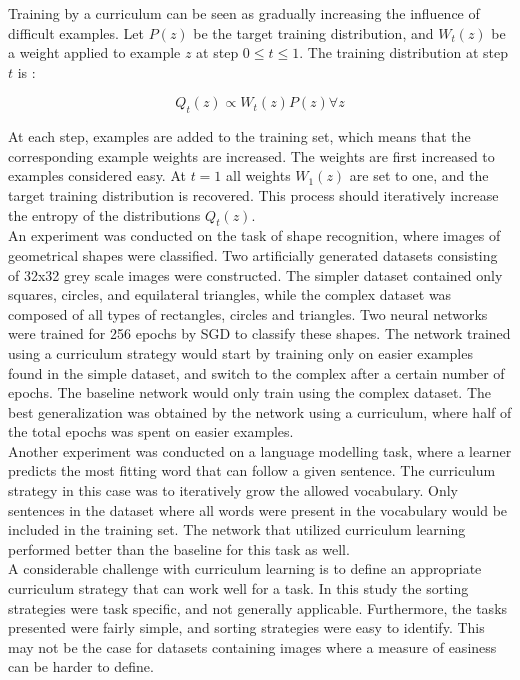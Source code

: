 Training by a curriculum can be seen as gradually increasing the influence of difficult examples. Let $P(z)$ be the target training distribution, and $W_{t}(z)$ be a weight applied to example $z$ at step $0\leq t\leq 1$. The training distribution at step $t$ is :

$$Q_{t}(z)\propto W_{t}(z)P(z)\forall z$$

At each step, examples are added to the training set, which means that the corresponding example weights are increased. The weights are first increased to examples considered easy.  
At $t=1$ all weights $W_{1}(z)$ are set to one, and the target training distribution is recovered. This process should iteratively increase the entropy of the distributions $Q_{t}(z)$. \\


An experiment was conducted on the task of shape recognition, where images of geometrical shapes were classified. Two artificially generated datasets consisting of 32x32 grey scale images were constructed. The simpler dataset contained only squares, circles, and equilateral triangles, while the complex dataset was composed of all types of rectangles, circles and triangles. Two neural networks were trained for 256 epochs by \ac{SGD} to classify these shapes. The network trained using a curriculum strategy would start by training only on easier examples found in the simple dataset, and switch to the complex after a certain number of epochs. The baseline network would only train using the complex dataset. The best generalization was obtained by the network using a curriculum, where half of the total epochs was spent on easier examples. \\

Another experiment was conducted on a language modelling task, where a learner predicts the most fitting word that can follow a given sentence. The curriculum strategy in this case was to iteratively grow the allowed vocabulary. Only sentences in the dataset where all words were present in the vocabulary would be included in the training set. The network that utilized curriculum learning performed better than the baseline for this task as well.\\

A considerable challenge with curriculum learning is to define an appropriate curriculum strategy that can work well for a task. In this study the sorting strategies were task specific, and not generally applicable. Furthermore, the tasks presented were fairly simple, and sorting strategies were easy to identify. This may not be the case for datasets containing images where a measure of easiness can be harder to define.\\


